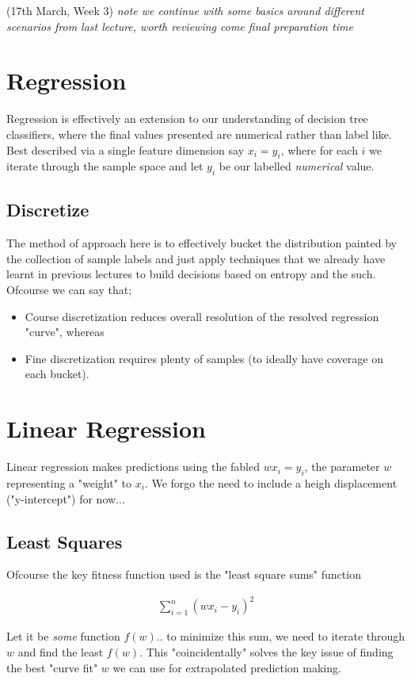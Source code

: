 \documentclass{article}
\begin{document}
(17th March, Week 3)
{\em note we continue with some basics around different scenarios from last lecture, worth reviewing come final preparation time}
\section*{Regression}
Regression is effectively an extension to our understanding of decision tree classifiers, where the final values presented are numerical rather than label like. Best described via a single feature dimension say $x_i = y_i$, where for each $i$ we iterate through the sample space and let $y_i$ be our labelled {\em numerical} value.

\subsection*{Discretize}
The method of approach here is to effectively bucket the distribution painted by the collection of sample labels and just apply techniques that we already have learnt in previous lectures to build decisions based on entropy and the such. Ofcourse we can say that;

\begin{itemize}
	\item Course discretization reduces overall resolution of the resolved regression "curve", whereas
	\item Fine discretization requires plenty of samples (to ideally have coverage on each bucket).
\end{itemize}

\section*{Linear Regression}
Linear regression makes predictions using the fabled $wx_i = \hat y_i$, the parameter $w$ representing a "weight" to $x_i$. We forgo the need to include a heigh displacement ("y-intercept") for now...

\subsection*{Least Squares}
Ofcourse the key fitness function used is the "least square sums" function 

\begin{align*}
\sum_{i=1}^{n}(wx_i-y_i)^2
\end{align*}

Let it be {\em some} function $f(w)$.. to minimize this sum, we need to iterate through $w$ and find the least $f(w)$. This "coincidentally" solves the key issue of finding the best "curve fit" $w$ we can use for extrapolated prediction making.
\end{document}
